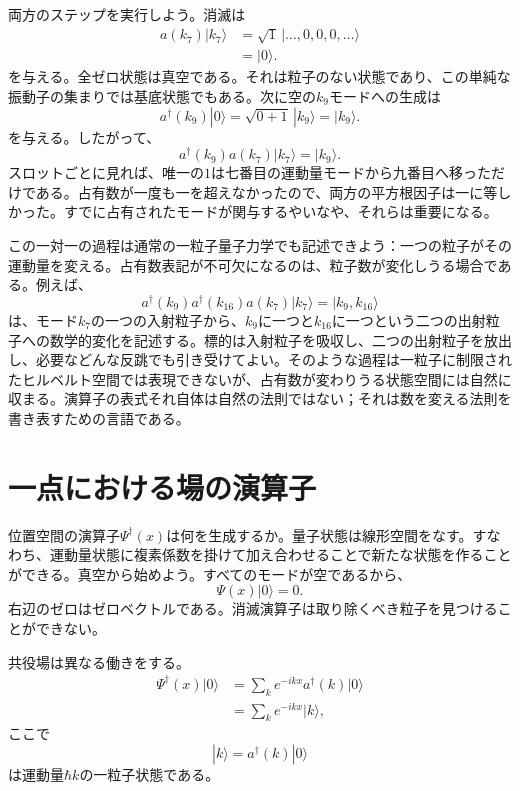 両方のステップを実行しよう。消滅は
\begin{align}
a(k_7)|k_7\rangle
&=
\sqrt{1}\,|\ldots,0,0,0,\ldots\rangle\\
&=|0\rangle.
\end{align}
を与える。全ゼロ状態は真空である。それは粒子のない状態であり、この単純な振動子の集まりでは基底状態でもある。次に空の\(k_9\)モードへの生成は
\begin{equation}
a^\dagger(k_9)|0\rangle
=\sqrt{0+1}\,|k_9\rangle
=|k_9\rangle.
\end{equation}
を与える。したがって、
\begin{equation}
a^\dagger(k_9)a(k_7)|k_7\rangle=|k_9\rangle.
\end{equation}
スロットごとに見れば、唯一の\(1\)は七番目の運動量モードから九番目へ移っただけである。占有数が一度も一を超えなかったので、両方の平方根因子は一に等しかった。すでに占有されたモードが関与するやいなや、それらは重要になる。

この一対一の過程は通常の一粒子量子力学でも記述できよう：一つの粒子がその運動量を変える。占有数表記が不可欠になるのは、粒子数が変化しうる場合である。例えば、
\begin{equation}
a^\dagger(k_9)a^\dagger(k_{16})a(k_7)|k_7\rangle
=|k_9,k_{16}\rangle
\end{equation}
は、モード\(k_7\)の一つの入射粒子から、\(k_9\)に一つと\(k_{16}\)に一つという二つの出射粒子への数学的変化を記述する。標的は入射粒子を吸収し、二つの出射粒子を放出し、必要などんな反跳でも引き受けてよい。そのような過程は一粒子に制限されたヒルベルト空間では表現できないが、占有数が変わりうる状態空間には自然に収まる。演算子の表式それ自体は自然の法則ではない；それは数を変える法則を書き表すための言語である。

\section{一点における場の演算子}

位置空間の演算子\(\Psi^\dagger(x)\)は何を生成するか。量子状態は線形空間をなす。すなわち、運動量状態に複素係数を掛けて加え合わせることで新たな状態を作ることができる。真空から始めよう。すべてのモードが空であるから、
\begin{equation}
\Psi(x)|0\rangle=0.
\end{equation}
右辺のゼロはゼロベクトルである。消滅演算子は取り除くべき粒子を見つけることができない。

共役場は異なる働きをする。
\begin{align}
\Psi^\dagger(x)|0\rangle
&=\sum_k e^{-ikx}a^\dagger(k)|0\rangle\\
&=\sum_k e^{-ikx}|k\rangle,
\end{align}
ここで
\begin{equation}
|k\rangle=a^\dagger(k)|0\rangle
\end{equation}
は運動量\(\hbar k\)の一粒子状態である。

